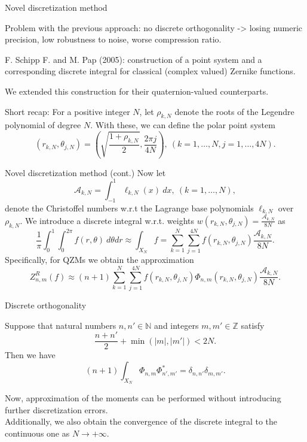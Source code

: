 \documentclass{beamer}
\newcommand{\N}{\mathbb{N}}
\newcommand{\Z}{\mathbb{Z}}
\def\N{{\mathbb N}}
\def\Z{{\mathbb Z}}
\begin{document}
\begin{frame}{Novel discretization method}
\vskip 5mm

    Problem with the previous approach: no discrete orthogonality -> losing numeric precision, low robustness to noise, worse compression ratio.

    F. Schipp F. and M. Pap (2005): construction of a point system and a corresponding discrete integral for classical (complex valued) Zernike functions.

    We extended this construction for their quaternion-valued counterparts.

    Short recap: For a positive integer $N$, let $\rho_{k,N}$ denote the roots of the Legendre polynomial of degree $N$. With these, we can define the polar point system
    $$(r_{k,N}, \theta_{j,N}) = \left(\sqrt{\frac{1+\rho_{k,N}}{2}} , \frac{2\pi j}{4N} \right), \ (k=1,\ldots,N,j=1,\ldots,4N).$$
    
\end{frame}

\begin{frame}{Novel discretization method (cont.)}
    \vskip 5mm
    Now let $$\mathcal{A}_{k,N} = \int_{-1}^{1} \ell_{k,N}(x)\ dx, \ (k=1,\ldots,N),$$ denote the Christoffel numbers w.r.t the Lagrange base polynomials $\ell_{k,N}$ over $\rho_{k,N}$.
    We introduce a discrete integral w.r.t. weights $w(r_{k,N},\theta_{j,N}) = \frac{\mathcal{A}_{k,N}}{8N}$ as
    $$\frac{1}{\pi} \int_{0}^1 \int_0^{2\pi} f(r,\theta)\ d\theta dr \approx \int_{X_N} f = \sum_{k=1}^{N} \sum_{j=1}^{4N} f(r_{k,N},\theta_{j,N}) \frac{\mathcal{A}_{k,N}}{8N}.$$
    Specifically, for QZMs we obtain the approximation
    $$Z^R_{n,m}(f) \approx (n+1)\sum_{k=1}^{N}\sum_{j=1}^{4N}f(r_{k,N},\theta_{j,N})\Phi_{n,m}(r_{k,N},\theta_{j,N})\frac{\mathcal{A}_{k,N}}{8N}.$$
\end{frame}


\begin{frame}{Discrete orthogonality}
\begin{theorem}
    Suppose that natural numbers $n, n' \in \N$ and integers $m, m' \in \Z$ satisfy $$\frac{n + n'}{2} + \min(|m|,|m'|) < 2N.$$
    Then we have $$(n + 1)\int_{X_N}\Phi_{n,m}\Phi_{n',m'}^* = \delta_{n,n'}\delta_{m,m'}.$$
\end{theorem}
Now, approximation of the moments can be performed without introducing further discretization errors. \\
Additionally, we also obtain the convergence of the discrete integral to the continuous one as $N\to+\infty$.
\end{frame}
\end{document}
